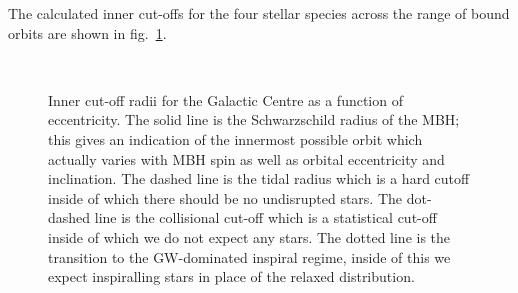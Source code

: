 \documentclass[useAMS,usedcolumn,usegraphicx,usenatbib]{mn2e}
\newcommand{\figref}[1]{fig.~\ref{fig:#1}}
\begin{document}
The calculated inner cut-offs for the four stellar species across the range of bound orbits are shown in \figref{Cuts}.
\begin{figure}
\begin{center}
    \quad 
    \\
    \quad
\caption{Inner cut-off radii for the Galactic Centre as a function of eccentricity. The solid line is the Schwarzschild radius of the MBH; this gives an indication of the innermost possible orbit which actually varies with MBH spin as well as orbital eccentricity and inclination. The dashed line is the tidal radius which is a hard cutoff inside of which there should be no undisrupted stars. The dot-dashed line is the collisional cut-off which is a statistical cut-off inside of which we do not expect any stars. The dotted line is the transition to the GW-dominated inspiral regime, inside of this we expect inspiralling stars in place of the relaxed distribution.\label{fig:Cuts}}
  \end{center}
\end{figure}
\end{document}
